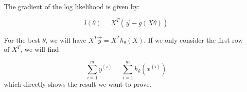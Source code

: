 \begin{answer}

The gradient of the log likelihood is given by:

$$
    l(\theta) = X^T(\vec{y} - g(X\theta))
$$

    For the best $\theta$, we will have $X^T\vec{y} = X^Th_\theta(X)$. If we only consider the first row of $X^T$, we will find

    $$
    \sum_{i=1}^my^{(i)} = \sum_{i=1}^m h_\theta(x^{(i)})
    $$
which directly shows the result we want to prove.
\end{answer}
